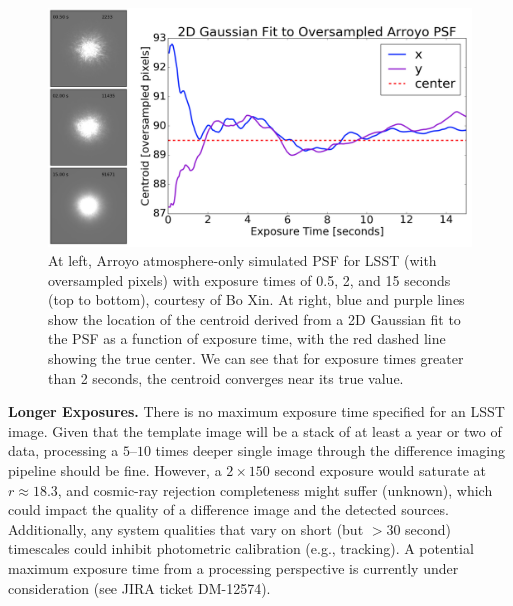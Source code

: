 \documentclass[DM,lsstdoc,toc]{lsstdoc}
\begin{document}
\begin{figure}
\begin{center}
\includegraphics[width=14cm,trim={0cm 0cm 0cm 0cm}, clip]{figures/exptime.png}
\caption{At left, Arroyo atmosphere-only simulated PSF for LSST (with oversampled pixels) with exposure times of 0.5, 2, and 15 seconds (top to bottom), courtesy of Bo Xin. At right, blue and purple lines show the location of the centroid derived from a 2D Gaussian fit to the PSF as a function of exposure time, with the red dashed line showing the true center. We can see that for exposure times greater than 2 seconds, the centroid converges near its true value. \label{fig:expt}}
\end{center}
\end{figure}

\textbf{Longer Exposures.} There is no maximum exposure time specified for an LSST image. Given that the template image will be a stack of at least a year or two of data, processing a $5$--$10$ times deeper single image through the difference imaging pipeline should be fine. However, a $2\times150$ second exposure would saturate at $r \approx 18.3$, and cosmic-ray rejection completeness might suffer (unknown), which could impact the quality of a difference image and the detected sources. Additionally, any system qualities that vary on short (but $>30$ second) timescales could inhibit photometric calibration (e.g., tracking). A potential maximum exposure time from a processing perspective is currently under consideration (see JIRA ticket DM-12574).
\end{document}
